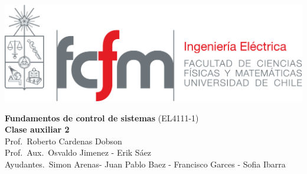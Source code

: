 \documentclass[
  11pt,
  letterpaper,
   addpoints,
   answers
  ]{exam}
\begin{document}
\noindent
\begin{minipage}{0.47\textwidth}
\includegraphics[width=\textwidth]{../fcfm_die}
\end{minipage}
\begin{minipage}{0.53\textwidth}
\begin{center} 
\large\textbf{Fundamentos de control de sistemas} (EL4111-1) \\
\large\textbf{Clase auxiliar 2} \\
\small Prof.~Roberto Cardenas Dobson\\
\small Prof.~Aux.~Osvaldo Jimenez - Erik Sáez\\
\small Ayudantes.~Simon Arenas- Juan Pablo Baez - Francisco Garces - Sofia Ibarra\\
\end{center}
\end{minipage}

\vspace{0.5cm}
\noindent
\vspace{.85cm}
\end{document}
